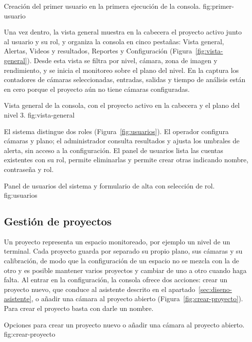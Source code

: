   {Creación del primer usuario en la primera ejecución de la consola.}
  {fig:primer-usuario}

Una vez dentro, la vista general muestra en la cabecera el proyecto
activo junto al usuario y su rol, y organiza la consola en cinco
pestañas: Vista general, Alertas, Videos y resultados, Reportes y
Configuración (Figura~\ref{fig:vista-general}). Desde esta vista se
filtra por nivel, cámara, zona de imagen y rendimiento, y se inicia el
monitoreo sobre el plano del nivel. En la captura los contadores de
cámaras seleccionadas, entradas, salidas y tiempo de análisis están en
cero porque el proyecto aún no tiene cámaras configuradas.

  {Vista general de la consola, con el proyecto activo en la cabecera y el
   plano del nivel 3.}
  {fig:vista-general}

El sistema distingue dos roles (Figura~\ref{fig:usuarios}). El operador
configura cámaras y plano; el administrador consulta resultados y ajusta
los umbrales de alerta, sin acceso a la configuración. El panel de
usuarios lista las cuentas existentes con su rol, permite eliminarlas y
permite crear otras indicando nombre, contraseña y rol.

  {Panel de usuarios del sistema y formulario de alta con selección de rol.}
  {fig:usuarios}

\subsection{Gestión de proyectos}
\label{sec:diseno-proyectos}

Un proyecto representa un espacio monitoreado, por ejemplo un nivel de un
terminal. Cada proyecto guarda por separado su propio plano, sus cámaras
y su calibración, de modo que la configuración de un espacio no se mezcla
con la de otro y es posible mantener varios proyectos y cambiar de uno a
otro cuando haga falta. Al entrar en la configuración, la consola ofrece
dos acciones: crear un proyecto nuevo, que conduce al asistente descrito
en el apartado~\ref{sec:diseno-asistente}, o añadir una cámara al
proyecto abierto (Figura~\ref{fig:crear-proyecto}). Para crear el
proyecto basta con darle un nombre.

  {Opciones para crear un proyecto nuevo o añadir una cámara al proyecto
   abierto.}
  {fig:crear-proyecto}

